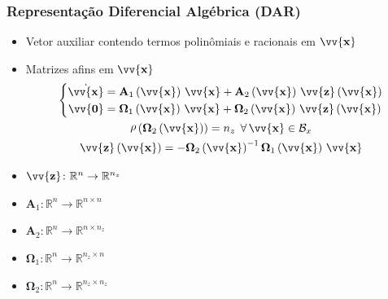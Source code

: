 \documentclass{beamer}
\DeclareMathOperator{\rank}{\rho}
\newcommand*{\Round}[1]{\left(#1\right)}
\newcommand*{\Prod}{\,}
\newcommand*{\Bold}[1]{\boldsymbol{\mathbf{#1}}}
\newcommand*{\Matr}[1]{\Bold{#1}}
\newcommand*{\Vect}[1]{\vv{\Bold{#1}}}
\newcommand*{\Inv}[1]{{#1}^{-1}}
\newcommand*{\Rank}[1]{\rank\Round{#1}}
\newcommand*{\ForAll}{\:\:\forall\,}
\renewcommand{\Prod}{\,}
\begin{document}
\begin{frame}\frametitle{Representação Diferencial Algébrica (DAR)}
  \begin{itemize}
    \item Vetor auxiliar contendo termos polinômiais e racionais em $\Vect{x}$
    \item Matrizes afins em $\Vect{x}$
    \begin{gather}
      \left\{\begin{aligned}
        \dot{\Vect{x}} &= \Matr{A}_1\Round{\Vect{x}} \Prod \Vect{x} + \Matr{A}_2\Round{\Vect{x}} \Prod \Vect{z}\Round{\Vect{x}}
        \\
        \Vect{0} &= \Matr{\Omega}_1\Round{\Vect{x}} \Prod \Vect{x} + \Matr{\Omega}_2\Round{\Vect{x}} \Prod \Vect{z}\Round{\Vect{x}}
      \end{aligned}\right.
      \\
      \Rank{\Matr{\Omega}_2\Round{\Vect{x}}} = n_z \ForAll \Vect{x} \in \mathcal{B}_x
      \\
      \Vect{z}\Round{\Vect{x}} = -\Inv{\Matr{\Omega}_2\Round{\Vect{x}}} \Prod \Matr{\Omega}_1\Round{\Vect{x}} \Prod \Vect{x}
    \end{gather}
    \item $\Vect{z} \colon \mathbb{R}^n \to \mathbb{R}^{n_z}$
    \item $\Matr{A}_1 \colon \mathbb{R}^n \to \mathbb{R}^{n \times n}$
    \item $\Matr{A}_2 \colon \mathbb{R}^n \to \mathbb{R}^{n \times n_z}$
    \item $\Matr{\Omega}_1 \colon \mathbb{R}^n \to \mathbb{R}^{n_z \times n}$
    \item $\Matr{\Omega}_2 \colon \mathbb{R}^n \to \mathbb{R}^{n_z \times n_z}$
  \end{itemize}
\end{frame}
\end{document}
